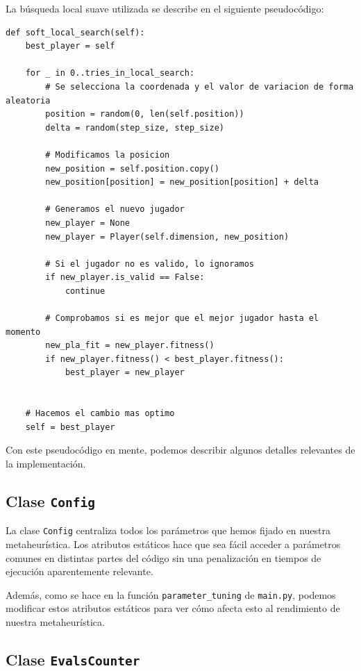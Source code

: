 \documentclass[11pt]{article}
\begin{document}
La búsqueda local suave utilizada se describe en el siguiente pseudocódigo:

\begin{lstlisting}
def soft_local_search(self):
    best_player = self

    for _ in 0..tries_in_local_search:
        # Se selecciona la coordenada y el valor de variacion de forma aleatoria
        position = random(0, len(self.position))
        delta = random(step_size, step_size)

        # Modificamos la posicion
        new_position = self.position.copy()
        new_position[position] = new_position[position] + delta

        # Generamos el nuevo jugador
        new_player = None
        new_player = Player(self.dimension, new_position)

        # Si el jugador no es valido, lo ignoramos
        if new_player.is_valid == False:
            continue

        # Comprobamos si es mejor que el mejor jugador hasta el momento
        new_pla_fit = new_player.fitness()
        if new_player.fitness() < best_player.fitness():
            best_player = new_player


    # Hacemos el cambio mas optimo
    self = best_player
\end{lstlisting}


Con este pseudocódigo en mente, podemos describir algunos detalles relevantes de la implementación.

\subsection{Clase \lstinline{Config}}

La clase \lstinline{Config} centraliza todos los parámetros que hemos fijado en nuestra metaheurística. Los atributos estáticos hace que sea fácil acceder a parámetros comunes en distintas partes del código sin una penalización en tiempos de ejecución aparentemente relevante.

Además, como se hace en la función \lstinline{parameter_tuning} de \lstinline{main.py}, podemos modificar estos atributos estáticos para ver cómo afecta esto al rendimiento de nuestra metaheurística.

\subsection{Clase \lstinline{EvalsCounter}}
\end{document}
